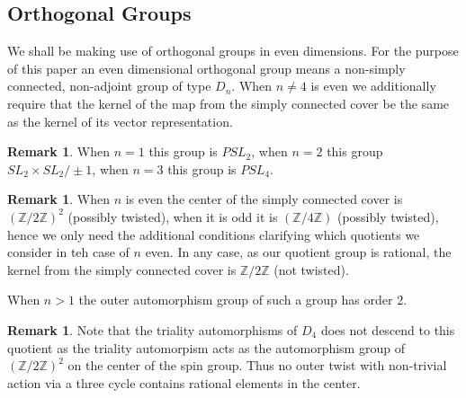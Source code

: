 \documentclass{article}
\theoremstyle{plain}
\theoremstyle{definition}
\newtheorem{remark}[theorem]{Remark}
\numberwithin{equation}{section}
\newcommand{\ZZ}{\mathbb{Z}}
\begin{document}
\subsection{Orthogonal Groups}

We shall be making use of orthogonal groups in even dimensions.
For the purpose of this paper an even dimensional orthogonal group means a non-simply connected, non-adjoint group of type $D_n$. When $n\neq 4$ is even we additionally require that the kernel of the map from the simply connected cover be the same as the kernel of its vector representation.

\begin{remark}
When $n=1$ this group is $PSL_2$, when $n=2$ this group $SL_2\times SL_2/\pm1$, when $n=3$ this group is $PSL_4$.
\end{remark}

\begin{remark}
When $n$ is even the center of the simply connected cover is $(\ZZ/2\ZZ)^2$ (possibly twisted), when it is odd it is $(\ZZ/4\ZZ)$ (possibly twisted), hence we only need the additional conditions clarifying which quotients we consider in teh case of $n$ even.
In any case, as our quotient group is rational, the kernel from the simply connected cover is $\ZZ/2\ZZ$ (not twisted).
\end{remark}

When $n>1$ the outer automorphism group of such a group has order $2$.
\begin{remark}
Note that the triality automorphisms of $D_4$ does not descend to this quotient as the triality automorpism acts as the automorphism group of $(\ZZ/2\ZZ)^2$ on the center of the spin group. Thus no outer twist with non-trivial action via a three cycle contains rational elements in the center.
\end{remark}
\end{document}
